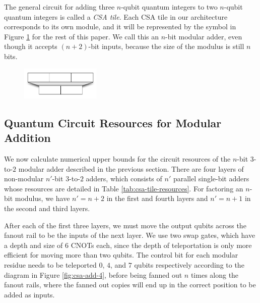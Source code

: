 The general circuit for adding three $n$-qubit quantum integers to
two $n$-qubit quantum integers is called a \emph{CSA tile}. Each CSA tile in our architecture 
corresponds to its own module, and it will be represented by the symbol in 
Figure \ref{fig:csa-tile-symbol} for the rest of this paper. We call this
an $n$-bit modular adder, even though it accepts $(n+2)$-bit inputs, because
the size of the modulus is still $n$ bits.

\begin{center}
\begin{figure}[h!bt]
\centerline{
\includegraphics[width=1.5in]{figures/csa-tile-symbol.pdf}
}
\label{fig:csa-tile-symbol}
\end{figure}
\end{center}


\subsection{Quantum Circuit Resources for Modular Addition}

We now calculate numerical upper bounds for the circuit resources of
the $n$-bit $3$-to-$2$ modular adder described in the previous section.
There are four layers of non-modular $n'$-bit $3$-to-$2$ adders, which
consists of $n'$ parallel single-bit adders whose
resources are detailed in Table \ref{tab:csa-tile-resources}. For factoring
an $n$-bit modulus, we have $n'=n+2$ in the first and fourth layers
and $n'=n+1$ in the second and third layers.

After each of the first three layers, we must move the output qubits
across the fanout rail to be the inputs of the next layer. We use
two swap gates, which have a depth and size of $6$ CNOTs each, since
the depth of teleportation is only more efficient for moving more than
two qubits. The control bit for each modular residue needs to be
teleported $0$, $4$, and $7$ qubits respectively according to the
diagram in Figure \ref{fig:csa-add-4}, before being fanned out $n$
times along the fanout rails, where the fanned out copies will end up
in the correct position to be added as inputs.


